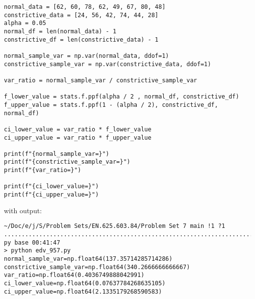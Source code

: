 \documentclass{article}
\begin{document}
{\begin{verbatim}
normal_data = [62, 60, 78, 62, 49, 67, 80, 48]
constrictive_data = [24, 56, 42, 74, 44, 28]
alpha = 0.05
normal_df = len(normal_data) - 1
constrictive_df = len(constrictive_data) - 1

normal_sample_var = np.var(normal_data, ddof=1)
constrictive_sample_var = np.var(constrictive_data, ddof=1)

var_ratio = normal_sample_var / constrictive_sample_var

f_lower_value = stats.f.ppf(alpha / 2 , normal_df, constrictive_df)
f_upper_value = stats.f.ppf(1 - (alpha / 2), constrictive_df, normal_df)

ci_lower_value = var_ratio * f_lower_value
ci_upper_value = var_ratio * f_upper_value

print(f"{normal_sample_var=}")
print(f"{constrictive_sample_var=}")
print(f"{var_ratio=}")

print(f"{ci_lower_value=}")
print(f"{ci_upper_value=}")
\end{verbatim}
with output:
\begin{verbatim}
~/Doc/e/j/S/Problem Sets/EN.625.603.84/Problem Set 7 main !1 ?1 ..................................................................................................... py base 00:41:47
> python edv_957.py
normal_sample_var=np.float64(137.35714285714286)
constrictive_sample_var=np.float64(340.2666666666667)
var_ratio=np.float64(0.4036749888042991)
ci_lower_value=np.float64(0.07637784268635105)
ci_upper_value=np.float64(2.1335179268590583)
\end{verbatim}


}
\end{document}
